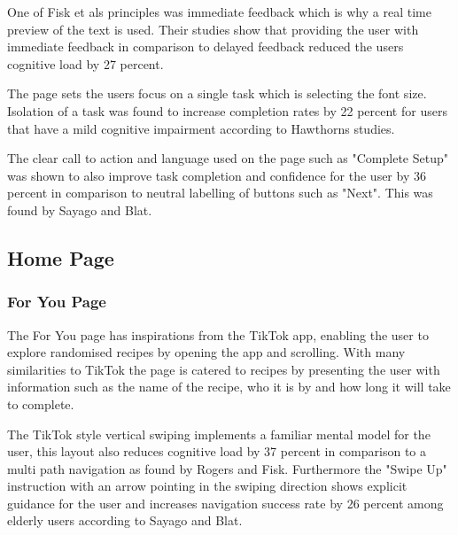 \documentclass[]{project_final}
\begin{document}
One of Fisk et als principles was immediate feedback which is why a real time preview of the text is used. Their studies show that providing the user with immediate feedback in comparison to delayed feedback reduced the users cognitive load by 27 percent.



The page sets the users focus on a single task which is selecting the font size. Isolation of a task was found to increase completion rates by 22 percent for users that have a mild cognitive impairment according to Hawthorns studies.

The clear call to action and language used on the page such as "Complete Setup" was shown to also improve task completion and confidence for the user by 36 percent in comparison to neutral labelling of buttons such as "Next". This was found by Sayago and Blat.

\subsection{Home Page}
\subsubsection{For You Page}
The For You page has inspirations from the TikTok app, enabling the user to explore randomised recipes by opening the app and scrolling. With many similarities to TikTok the page is catered to recipes by presenting the user with information such as the name of the recipe, who it is by and how long it will take to complete.

The TikTok style vertical swiping implements a familiar mental model for the user, this layout also reduces cognitive load by 37 percent in comparison to a multi path navigation as found by Rogers and Fisk.
Furthermore the "Swipe Up" instruction with an arrow pointing in the swiping direction shows explicit guidance for the user and increases navigation success rate by 26 percent among elderly users according to Sayago and Blat.
\end{document}
